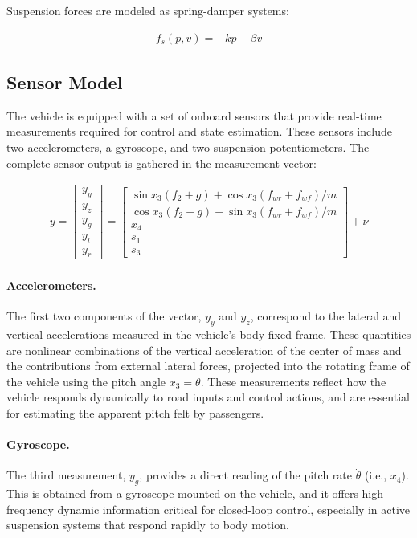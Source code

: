 \documentclass[]{report}
\begin{document}
Suspension forces are modeled as spring-damper systems:

\begin{align}
	f_s(p, v) = -k p - \beta v
\end{align}

\subsection{Sensor Model}

The vehicle is equipped with a set of onboard sensors that provide real-time measurements required for control and state estimation. These sensors include two accelerometers, a gyroscope, and two suspension potentiometers. The complete sensor output is gathered in the measurement vector:

\begin{align}
	y = \begin{bmatrix}
		y_y \\ y_z \\ y_g \\ y_l \\ y_r
	\end{bmatrix} =
	\begin{bmatrix}
		\sin x_3(f_2 + g) + \cos x_3(f_{wr} + f_{wf})/m \\
		\cos x_3(f_2 + g) - \sin x_3(f_{wr} + f_{wf})/m \\
		x_4 \\
		s_1 \\
		s_3
	\end{bmatrix} + \nu
\end{align}

\paragraph{Accelerometers.}
The first two components of the vector, $y_y$ and $y_z$, correspond to the lateral and vertical accelerations measured in the vehicle's body-fixed frame. These quantities are nonlinear combinations of the vertical acceleration of the center of mass and the contributions from external lateral forces, projected into the rotating frame of the vehicle using the pitch angle $x_3 = \theta$. These measurements reflect how the vehicle responds dynamically to road inputs and control actions, and are essential for estimating the apparent pitch felt by passengers.

\paragraph{Gyroscope.}
The third measurement, $y_g$, provides a direct reading of the pitch rate $\dot{\theta}$ (i.e., $x_4$). This is obtained from a gyroscope mounted on the vehicle, and it offers high-frequency dynamic information critical for closed-loop control, especially in active suspension systems that respond rapidly to body motion.
\end{document}
